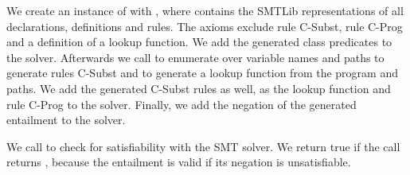 We create an instance of 
with , where 
contains the SMTLib representations of all
declarations, definitions and rules.
The axioms exclude rule C-Subst, rule C-Prog
and a definition of a lookup function.
We add the generated class predicates to the solver.
Afterwards we call 
to enumerate over variable names and paths to
generate rules C-Subst
and 
to generate a lookup function from the program and paths.
We add the generated C-Subst rules as well,
as the lookup function and rule C-Prog to the solver.
Finally, we add the negation of the generated
entailment  to the solver.

We call  to check
for satisfiability with the SMT solver.
We return true if the call returns ,
because the entailment 
is valid if its negation is unsatisfiable.

